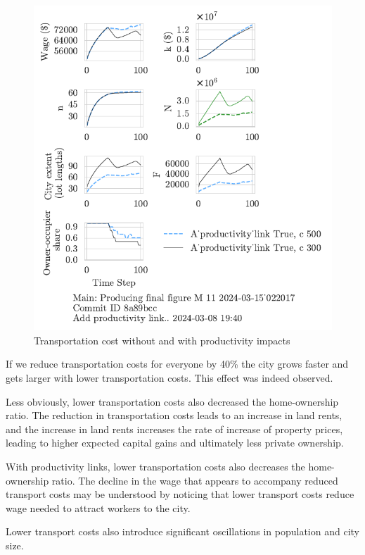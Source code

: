 \begin{figure}[h!tb]
    \includegraphics[scale=.75, trim={0 1.4cm 2.3cm 0},clip]{fig/With-productivity_link-c-15_022017.pdf} 
    \caption{Transportation cost without and with productivity impacts}
    \label{fig:Productivity_link_W-WO-transportation-cost}
\end{figure}
If we reduce transportation costs for everyone by 40\% the city grows faster and gets larger with lower transportation costs. This effect was indeed observed. 

Less obviously, lower transportation costs also decreased the home-ownership ratio. The reduction in transportation costs leads to an increase in land rents, and the increase in land rents increases the rate of increase of property prices, leading to higher expected capital gains and ultimately less private ownership. 

With productivity links, lower transportation costs also decreases the home-ownership ratio. 
The decline in the wage that appears to accompany reduced transport costs may be understood by noticing that lower transport costs reduce wage needed to attract workers to the city. 

Lower transport costs also introduce significant oscillations in population and city size. 



